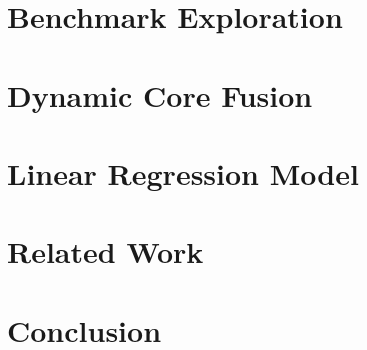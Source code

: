 \vspace{5mm}
\section{Benchmark Exploration}\label{sec:expl}


\section{Dynamic Core Fusion}\label{sec:dynamic}



\section{Linear Regression Model}\label{sec:model}


\section{Related Work}\label{sec:related}


\section{Conclusion}\label{sec:conc}



 
